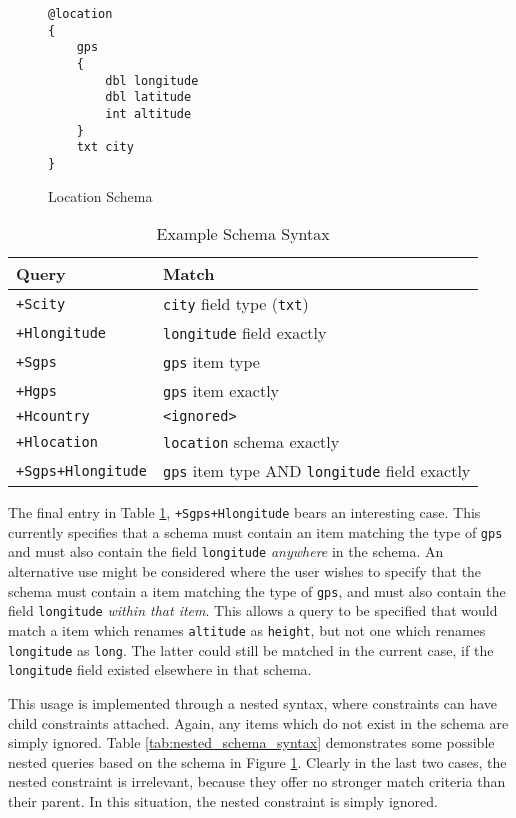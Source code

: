 \documentclass[12pt,twoside,notitlepage]{report}
\begin{document}
\begin{figure}
\begin{lstlisting}
@location
{
	gps
	{
		dbl longitude
		dbl latitude
		int altitude
	}
	txt city
}
\end{lstlisting}
\caption{Location Schema}
\label{fig:locationschema}
\end{figure}

\begin{table}
\centering

\begin{tabular}{l l}
\hline\hline
Query & Match \\
\hline

{\tt +Scity}		& {\tt city} field type ({\tt txt}) \\
{\tt +Hlongitude}	& {\tt longitude} field exactly \\

{\tt +Sgps}			& {\tt gps} item type \\
{\tt +Hgps}			& {\tt gps} item exactly \\

{\tt +Hcountry}		& {\tt <ignored>} \\
{\tt +Hlocation}	& {\tt location} schema exactly \\

{\tt +Sgps+Hlongitude}	& {\tt gps} item type AND {\tt longitude} field exactly \\

\hline
\end{tabular}

\caption{Example Schema Syntax}
\label{tab:example_schema_syntax}
\end{table}

The final entry in Table \ref{tab:example_schema_syntax}, {\tt +Sgps+Hlongitude} bears an interesting case. 
This currently specifies that a schema must contain an item matching the type of {\tt gps} and must also contain the field {\tt longitude} {\sl anywhere} in the schema. 
An alternative use might be considered where the user wishes to specify that the schema must contain a item matching the type of {\tt gps}, and must also contain the field {\tt longitude} {\sl within that item}. 
This allows a query to be specified that would match a item which renames {\tt altitude} as {\tt height}, but not one which renames {\tt longitude} as {\tt long}. 
The latter could still be matched in the current case, if the {\tt longitude} field existed elsewhere in that schema. 

This usage is implemented through a nested syntax, where constraints can have child constraints attached. 
Again, any items which do not exist in the schema are simply ignored. 
Table \ref{tab:nested_schema_syntax} demonstrates some possible nested queries based on the schema in Figure \ref{fig:locationschema}. 
Clearly in the last two cases, the nested constraint is irrelevant, because they offer no stronger match criteria than their parent. 
In this situation, the nested constraint is simply ignored.
\end{document}
